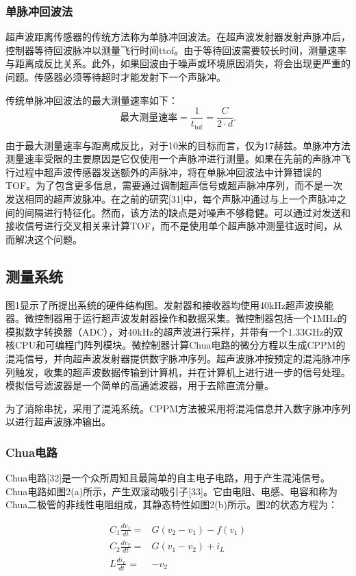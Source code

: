 \subsubsection{单脉冲回波法}
超声波距离传感器的传统方法称为单脉冲回波法。在超声波发射器发射声脉冲后，控制器等待回波脉冲以测量飞行时间ttof。由于等待回波需要较长时间，测量速率与距离成反比关系。此外，如果回波由于噪声或环境原因消失，将会出现更严重的问题。传感器必须等待超时才能发射下一个声脉冲。

传统单脉冲回波法的最大测量速率如下：
\begin{equation*} \text {最大测量速率} = \frac {1}{t_{\text {tof}}} = \frac {C}{2 \cdot d}. \tag{3}\end{equation*}

由于最大测量速率与距离成反比，对于10米的目标而言，仅为17赫兹。单脉冲方法测量速率受限的主要原因是它仅使用一个声脉冲进行测量。如果在先前的声脉冲飞行过程中超声波传感器发送额外的声脉冲，将在单脉冲回波法中计算错误的TOF。为了包含更多信息，需要通过调制超声信号或超声脉冲序列，而不是一次发送相同的超声波脉冲。在之前的研究[31]中，每个声脉冲通过与上一个声脉冲之间的间隔进行特征化。然而，该方法的缺点是对噪声不够稳健。可以通过对发送和接收信号进行交叉相关来计算TOF，而不是使用单个超声脉冲测量往返时间，从而解决这个问题。

\subsection{测量系统}
图1显示了所提出系统的硬件结构图。发射器和接收器均使用40kHz超声波换能器。微控制器用于运行超声波发射器操作和数据采集。微控制器包括一个1MHz的模拟数字转换器（ADC），对40kHz的超声波进行采样，并带有一个1.33GHz的双核CPU和可编程门阵列模块。微控制器计算Chua电路的微分方程以生成CPPM的混沌信号，并向超声波发射器提供数字脉冲序列。超声波脉冲按预定的混沌脉冲序列触发，收集的超声波数据传输到计算机，并在计算机上进行进一步的信号处理。模拟信号滤波器是一个简单的高通滤波器，用于去除直流分量。

为了消除串扰，采用了混沌系统。CPPM方法被采用将混沌信息并入数字脉冲序列以进行超声波脉冲输出。

\subsubsection{Chua电路}
Chua电路[32]是一个众所周知且最简单的自主电子电路，用于产生混沌信号。Chua电路如图2(a)所示，产生双滚动吸引子[33]。它由电阻、电感、电容和称为Chua二极管的非线性电阻组成，其静态特性如图2(b)所示。图2的状态方程为：

\begin{align*}
	C_{1} \frac {dv_{1}}{dt}=&G (v_{2} - v_{1}) - f(v_{1}) \\
	C_{2} \frac {dv_{2}}{dt}=&G (v_{1} - v_{2}) + i_{L} \\
	L \frac {di_{L}}{dt}=&-v_{2} \tag{4}
\end{align*}

